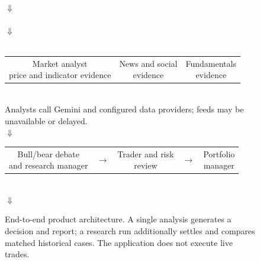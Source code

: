 \documentclass[10pt]{article}
\begin{document}
\begin{figure}[ht]
\centering
\setlength{\fboxsep}{4pt}
\begin{minipage}{0.96\linewidth}\centering
{}\\[-1pt]
$\Downarrow$\\[-1pt]
\\[-1pt]
$\Downarrow$\\[-1pt]
\\[3pt]
\begin{tabular}{ccc}
\fbox{\parbox[c][12mm][c]{0.27\linewidth}{\centering\footnotesize Market analyst\\price and indicator evidence}} &
\fbox{\parbox[c][12mm][c]{0.27\linewidth}{\centering\footnotesize News and social\\evidence}} &
\fbox{\parbox[c][12mm][c]{0.27\linewidth}{\centering\footnotesize Fundamentals\\evidence}}
\end{tabular}\\[-1pt]
\scriptsize Analysts call Gemini and configured data providers; feeds may be unavailable or delayed.\\[-1pt]
$\Downarrow$\\[-1pt]
\begin{tabular}{ccccc}
\fbox{\parbox[c][13mm][c]{0.21\linewidth}{\centering\footnotesize Bull/bear debate\\and research manager}} & $\rightarrow$ &
\fbox{\parbox[c][13mm][c]{0.21\linewidth}{\centering\footnotesize Trader and risk\\review}} & $\rightarrow$ &
\fbox{\parbox[c][13mm][c]{0.21\linewidth}{\centering\footnotesize Portfolio\\manager}}
\end{tabular}\\[-1pt]
$\Downarrow$\\[-1pt]
\end{minipage}
\caption{End-to-end product architecture. A single analysis generates a decision and report; a research run additionally settles and compares matched historical cases. The application does not execute live trades.}
\label{fig:architecture}
\end{figure}
\end{document}
